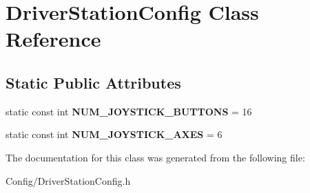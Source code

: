 \hypertarget{class_driver_station_config}{
\section{\-Driver\-Station\-Config \-Class \-Reference}
\label{class_driver_station_config}
}
\subsection*{\-Static \-Public \-Attributes}
\begin{DoxyCompactItemize}
\item 
\hypertarget{class_driver_station_config_a38682d1a4d65e8831781953451173f32}{
static const int {\bfseries \-N\-U\-M\-\_\-\-J\-O\-Y\-S\-T\-I\-C\-K\-\_\-\-B\-U\-T\-T\-O\-N\-S} = 16}
\label{class_driver_station_config_a38682d1a4d65e8831781953451173f32}

\item 
\hypertarget{class_driver_station_config_ae65eb0493cc153b4eda7634cd02d3ac0}{
static const int {\bfseries \-N\-U\-M\-\_\-\-J\-O\-Y\-S\-T\-I\-C\-K\-\_\-\-A\-X\-E\-S} = 6}
\label{class_driver_station_config_ae65eb0493cc153b4eda7634cd02d3ac0}

\end{DoxyCompactItemize}


\-The documentation for this class was generated from the following file\-:\begin{DoxyCompactItemize}
\item 
\-Config/\-Driver\-Station\-Config.\-h\end{DoxyCompactItemize}
